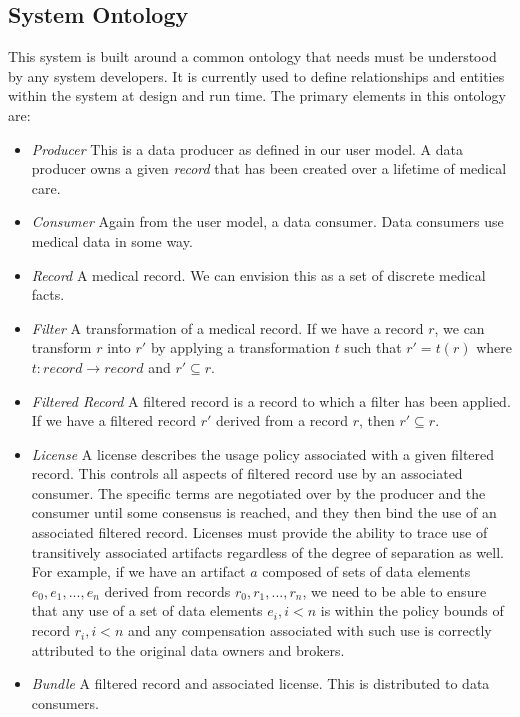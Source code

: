 \documentclass[10pt, conference, compsocconf]{IEEEtran}
\begin{document}
\subsection*{System Ontology}
This system is built around a common ontology that needs must be understood by any system developers.  It is currently used to define relationships and entities within the system at design and run time.  The primary elements in this ontology are:
\begin{itemize}
\item \textit{Producer} This is a data producer as defined in our user model.  A data producer owns a given \textit{record} that has been created over a lifetime of medical care.
\item \textit{Consumer} Again from the user model, a data consumer.  Data consumers use medical data in some way.
\item \textit{Record} A medical record.  We can envision this as a set of discrete medical facts.
\item \textit{Filter} A transformation of a medical record.  If we have a record $ r $, we can transform $ r $ into $ r' $ by applying a transformation $ t $ such that $ r' = t(r) $ where $ t : record \rightarrow record $ and $ r' \subseteq r $.
\item \textit{Filtered Record} A filtered record is a record to which a filter has been applied.  If we have a filtered record $ r' $ derived from a record $ r $, then $ r' \subseteq r $.
\item \textit{License} A license describes the usage policy associated with a given filtered record.  This controls all aspects of filtered record use by an associated consumer.  The specific terms are negotiated over by the producer and the consumer until some consensus is reached, and they then bind the use of an associated filtered record.  Licenses must provide the ability to trace use of transitively associated artifacts regardless of the degree of separation as well.  For example, if we have an artifact $ a $ composed of sets of data elements $ e_{0}, e_{1}, ... , e_{n} $ derived from records $ r_{0}, r_{1}, ... , r_{n} $, we need to be able to ensure that any use of a set of data elements $ e_{i}, i < n $ is within the policy bounds of record $ r_{i}, i < n $ and any compensation associated with such use is correctly attributed to the original data owners and brokers.
\item \textit{Bundle} A filtered record and associated license.  This is distributed to data consumers.
\end{itemize}
\end{document}
